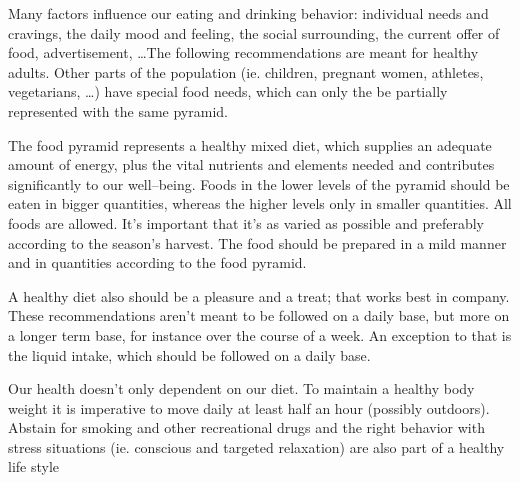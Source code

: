 \documentclass[../main.tex]{subfiles}
\begin{document}
Many factors influence our eating and drinking behavior: individual needs and cravings, the daily mood and feeling, the social surrounding,
the current offer of food, advertisement, \ldots The following recommendations are meant for healthy adults.
Other parts of the population (ie. children, pregnant women, athletes, vegetarians, \ldots) have special food needs,
which can only the be partially represented with the same pyramid.


The food pyramid represents a healthy mixed diet, which supplies an adequate amount of energy, plus the vital nutrients and elements needed
and contributes significantly to our well--being.
Foods in the lower levels of the pyramid should be eaten in bigger quantities, whereas the higher levels only in smaller quantities.
All foods are allowed.
It's important that it's as varied as possible and preferably according to the season's harvest.
The food should be prepared in a mild manner and in quantities according to the food pyramid.


A healthy diet also should be a pleasure and a treat; that works best in company.
These recommendations aren't meant to be followed on a daily base, but more on a longer term base, for instance over the course of a week.
An exception to that is the liquid intake, which should be followed on a daily base.

Our health doesn't only dependent on our diet.
To maintain a healthy body weight it is imperative to move daily at least half an hour (possibly outdoors).
Abstain for smoking and other recreational drugs and the right behavior with stress situations
(ie. conscious and targeted relaxation) are also part of a healthy life style
\end{document}
